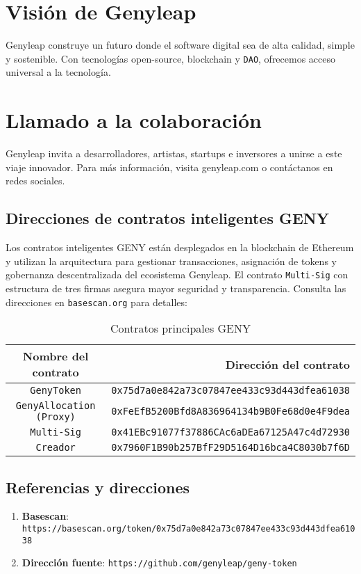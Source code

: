 \documentclass[a4paper,12pt,openany]{book}
\begin{document}
\chapter{Visión de Genyleap}
Genyleap construye un futuro donde el software digital sea de alta calidad, simple y sostenible. Con tecnologías open-source, blockchain y \texttt{DAO}, ofrecemos acceso universal a la tecnología.

\chapter{Llamado a la colaboración}
Genyleap invita a desarrolladores, artistas, startups e inversores a unirse a este viaje innovador. Para más información, visita genyleap.com o contáctanos en redes sociales.

\section*{Direcciones de contratos inteligentes GENY}
Los contratos inteligentes GENY están desplegados en la blockchain de Ethereum y utilizan la arquitectura  para gestionar transacciones, asignación de tokens y gobernanza descentralizada del ecosistema Genyleap. El contrato \texttt{Multi-Sig} con estructura de tres firmas asegura mayor seguridad y transparencia. Consulta las direcciones en \texttt{basescan.org} para detalles:

\begin{table}[h]
\centering
\caption*{Contratos principales GENY}
\small
\begin{tabular}{c r}
\hline
\textbf{Nombre del contrato} & \textbf{Dirección del contrato} \\
\hline
\texttt{GenyToken} & {\texttt{0x75d7a0e842a73c07847ee433c93d443dfea61038}} \\
\texttt{GenyAllocation (Proxy)} & {\texttt{0xFeEfB5200Bfd8A836964134b9B0Fe68d0e4F9dea}} \\
\texttt{Multi-Sig} & {\texttt{0x41EBc91077f37886CAc6aDEa67125A47c4d72930}} \\
\texttt{Creador} & {\texttt{0x7960F1B90b257BfF29D5164D16bca4C8030b7f6D}} \\
\hline
\end{tabular}
\end{table}

\section*{Referencias y direcciones}

\begin{enumerate}
    \item \textbf{Basescan}: \texttt{https://basescan.org/token/0x75d7a0e842a73c07847ee433c93d443dfea61038}
    \item \textbf{Dirección fuente}: \texttt{https://github.com/genyleap/geny-token}
\end{enumerate}
\end{document}
